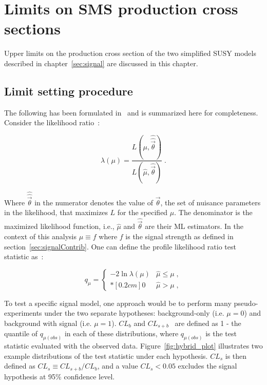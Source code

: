 \clearpage
\section{Limits on SMS production cross sections\label{sec:interpretation}}

Upper limits on the production cross section of the two simplified 
SUSY models described in chapter~\ref{sec:signal} are discussed in this
chapter. 


\subsection{Limit setting procedure\label{sec:cls}}

The following has been formulated in~\cite{LairdThesis} and is summarized 
here for completeness. 
Consider the likelihood ratio~\cite{Cowan:2010js}:

\begin{equation}
\label{eq:PLR}
\lambda(\mu) = \frac{ L(\mu,
\hat{\hat{\vec{\theta}}}) } {L(\hat{\mu}, \hat{\vec{\theta}}) } \;.
\end{equation}

Where $\hat{\hat{\vec{\theta}}}$ in the numerator denotes the
value of $\vec{\theta}$, the set of nuisance parameters in the likelihood,
that maximizes $L$ for the specified $\mu$.
The denominator is the maximized likelihood function, i.e., $\hat{\mu}$
and $\hat{\vec{\theta}}$ are their ML estimators. In the context of this
analysis $\mu \equiv f$ where $f$ is the signal strength as defined 
in section~\ref{sec:signalContrib}.  One can define the profile
likelihood ratio test statistic as~\cite{Cowan:2010js}:

\begin{equation}
\label{eq:qmu}
q_{\mu} =
\left\{ \! \! \begin{array}{ll}
               - 2 \ln \lambda(\mu)  & \hat{\mu} \le \mu  \;, \\*[0.2 cm]
               0 & \hat{\mu} > \mu \;,
              \end{array}
       \right.
\end{equation}

To test a specific signal model, one approach would be to perform many 
pseudo-experiments under the two separate hypotheses: background-only 
(i.e. $\mu=0$) and background with signal (i.e. $\mu=1$). $CL_{b}$ and 
$CL_{s+b}$~\cite{read,Junk} are defined as 1 - the quantile of $q_{\mu(obs)}$ in each of 
these distributions, where $q_{\mu(obs)}$ is the test statistic evaluated 
with the observed data. Figure~\ref{fig:hybrid_plot} illustrates two example distributions of
the test statistic under each hypothesis.  $CL_{s}$ is then defined as $CL_{s} \equiv CL_{s+b}/CL_{b}$, 
and a value $CL_{s} < 0.05$ excludes the signal hypothesis at 95\% confidence level. 

